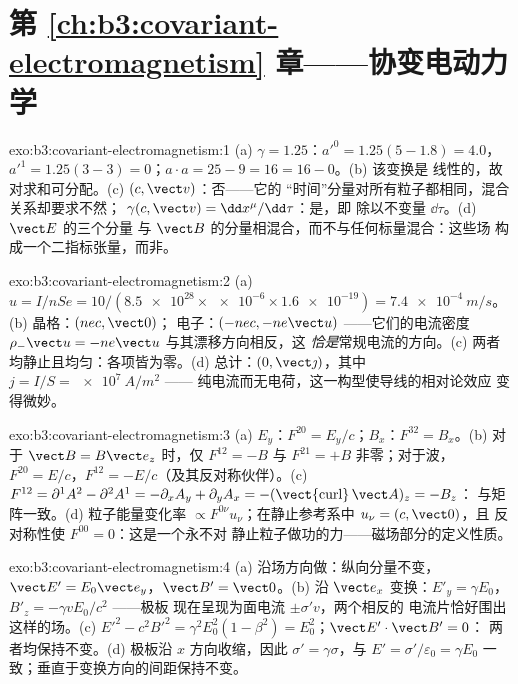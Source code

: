 \section*{第 \ref{ch:b3:covariant-electromagnetism} 章——协变电动力学}

\begin{solution}{exo:b3:covariant-electromagnetism:1}
(a) $\gamma = 1.25$：$a'^0 = 1.25(5 - 1.8) = 4.0$，$a'^1 = 1.25(3 -
3) = 0$；$a\cdot a = 25 - 9 = 16 = 16 - 0$。(b) 该变换是
线性的，故对求和可分配。(c) $(c, \vect v)$：否——它的
“时间”分量对所有粒子都相同，混合关系却要求不然；
$\gamma(c, \vect v) = \dd x^\mu/\dd\tau$：是，即
除以不变量 $\dd\tau$。(d) $\vect E$ 的三个分量
与 $\vect B$ 的分量相混合，而不与任何标量混合：这些场
构成一个二指标张量，而非。
\end{solution}

\begin{solution}{exo:b3:covariant-electromagnetism:2}
(a) $u = I/nSe = 10/(\num{8.5e28} \times \num{e-6} \times
\num{1.6e-19}) = \qty{7.4e-4}{m/s}$。(b) 晶格：$(nec, \vect 0)$；
电子：$(-nec, -ne\vect u)$ ——它们的电流密度
$\rho_-\vect u = -ne\vect u$ 与其漂移方向相反，这
\emph{恰是}常规电流的方向。(c) 两者均静止且均匀：各项皆为零。(d)
总计：$(0, \vect\jmath)$，其中 $j = I/S = \qty{e7}{A/m^2}$ ——
纯电流而无电荷，这一构型使导线的相对论效应
变得微妙。
\end{solution}

\begin{solution}{exo:b3:covariant-electromagnetism:3}
(a) $E_y$：$F^{20} = E_y/c$；$B_x$：$F^{32} = B_x$。(b) 对于 $\vect B
= B\vect e_z$ 时，仅 $F^{12} = -B$ 与 $F^{21} = +B$ 非零；对于波，
$F^{20} = E/c$，$F^{12} = -E/c$（及其反对称伙伴）。(c)
$F^{12} = \partial^1A^2 - \partial^2A^1 = -\partial_xA_y +
\partial_yA_x = -(\operatorname{\vect{curl}}\vect A)_z = -B_z$：
与矩阵一致。(d) 粒子能量变化率
$\propto F^{0\nu}u_\nu$；在静止参考系中 $u_\nu = (c, \vect 0)$，且
反对称性使 $F^{00} = 0$：这是一个永不对
静止粒子做功的力——磁场部分的定义性质。
\end{solution}

\begin{solution}{exo:b3:covariant-electromagnetism:4}
(a) 沿场方向做：纵向分量不变，$\vect
E' = E_0\vect e_y$，$\vect B' = \vect 0$。(b) 沿 $\vect
e_x$ 变换：$E'_y = \gamma E_0$，$B'_z = -\gamma vE_0/c^2$ ——极板
现在呈现为面电流 $\pm\sigma'v$，两个相反的
电流片恰好围出这样的场。(c) $E'^2 - c^2B'^2 =
\gamma^2E_0^2(1 - \beta^2) = E_0^2$；$\vect E'\cdot\vect B' = 0$：
两者均保持不变。(d) 极板沿 $x$ 方向收缩，因此 $\sigma' =
\gamma\sigma$，与 $E' = \sigma'/\varepsilon_0 = \gamma
E_0$ 一致；垂直于变换方向的间距保持不变。
\end{solution}

